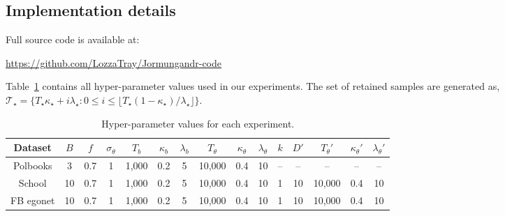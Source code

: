 \subsection{Implementation details}
\label{appdx:hyperparams}

Full source code is available at:\\
\centerline{\url{https://github.com/LozzaTray/Jormungandr-code}}
Table~\ref{tab:hyperparams} contains all 
hyper-parameter values used in our experiments. The set of retained 
samples are generated as,
$
	\mathcal{T}_\star = \{T_\star \kappa_\star + i \lambda_\star :  
	0 \leq i \leq \lfloor T_\star(1 - \kappa_\star) / \lambda_\star \rfloor \}.
$
%
\begin{table}[!ht]
	\centering
	\caption{Hyper-parameter values for each experiment.}
	\label{tab:hyperparams}
	\begin{tabular}{c|ccc|ccc|ccc|cc|ccc}
		Dataset & 
		$B$ & $f$ & $\sigma_\theta$ & 
		$T_b$ & $\kappa_b$ & $\lambda_b$ & 
		$T_\theta$ & $\kappa_\theta$ & $\lambda_\theta$ & %
		$k$ & $D'$ &
		$T_\theta'$ & $\kappa_\theta'$ & $\lambda_\theta'$ %
		\\ \hline
		Polbooks &
		3 & 0.7 & 1 &
		1,000 & 0.2 & 5 &
		10,000 & 0.4 & 10 & %
		-- & -- & 
		-- & -- & -- %
		\\
		School &
		10 & 0.7 & 1 &
		1,000 & 0.2 & 5 &
		10,000 & 0.4 & 10 & %
		1 & 10 & 
		10,000 & 0.4 & 10 %
		\\
		FB egonet &
		10 & 0.7 & 1 &
		1,000 & 0.2 & 5 &
		10,000 & 0.4 & 10 & %
		1 & 10 & 
		10,000 & 0.4 & 10 %
		\\
	\end{tabular}
\end{table}
